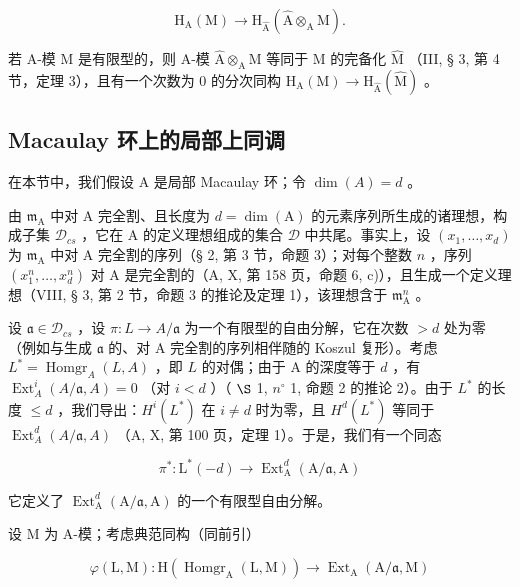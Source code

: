 \[
\mathrm{H} _ {\mathrm{A}} (\mathrm{M}) \longrightarrow \mathrm{H} _ {\widehat {\mathrm{A}}} (\widehat {\mathrm{A}} \otimes_ {\mathrm{A}} \mathrm{M}).
\]

若 A-模 M 是有限型的，则 A-模 \(\widehat{\mathrm{A}}\otimes_{\mathrm{A}}\mathrm{M}\) 等同于 M 的完备化 \(\widehat{\mathrm{M}}\) （III, § 3, 第 4 节，定理 3），且有一个次数为 0 的分次同构 \(\mathrm{H}_{\mathrm{A}}(\mathrm{M})\to \mathrm{H}_{\widehat{\mathrm{A}}}(\widehat{\mathrm{M}})\) 。

\subsection{Macaulay 环上的局部上同调}

在本节中，我们假设 A 是局部 Macaulay 环；令 \(\dim(A) = d\) 。

由 \(\mathfrak{m}_{\mathrm{A}}\) 中对 A 完全割、且长度为 \(d = \dim (\mathrm{A})\) 的元素序列所生成的诸理想，构成子集 \(\mathcal{D}_{cs}\) ，它在 A 的定义理想组成的集合 \(\mathcal{D}\) 中共尾。事实上，设 \((x_{1},\ldots ,x_{d})\) 为 \(\mathfrak{m}_{\mathrm{A}}\) 中对 A 完全割的序列（§ 2, 第 3 节，命题 3）；对每个整数 \(n\) ，序列 \((x_1^n,\dots ,x_d^n)\) 对 A 是完全割的（A, X, 第 158 页，命题 6, c)），且生成一个定义理想（VIII, § 3, 第 2 节，命题 3 的推论及定理 1），该理想含于 \(\mathfrak{m}_{\mathrm{A}}^n\) 。

设 \(\mathfrak{a} \in \mathcal{D}_{cs}\) ，设 \(\pi: L \to A/\mathfrak{a}\) 为一个有限型的自由分解，它在次数 \(>d\) 处为零（例如与生成 \(\mathfrak{a}\) 的、对 A 完全割的序列相伴随的 Koszul 复形）。考虑 \(L^{*} = \operatorname{Homgr}_{A}(L,A)\) ，即 \(L\) 的对偶；由于 A 的深度等于 \(d\) ，有 \(\operatorname{Ext}_{A}^{i}(A/\mathfrak{a}, A) = 0\) （对 \(i < d\) ）（ \(\S\) 1, \(n^{\circ}\) 1, 命题 2 的推论 2）。由于 \(L^{*}\) 的长度 \(\leqslant d\) ，我们导出：\(H^{i}(L^{*})\) 在 \(i \neq d\) 时为零，且 \(H^{d}(L^{*})\) 等同于 \(\operatorname{Ext}_{A}^{d}(A/\mathfrak{a}, A)\) （A, X, 第 100 页，定理 1）。于是，我们有一个同态

\[
\pi^ {*}: \mathrm{L} ^ {*} (- d) \longrightarrow \operatorname{Ext} _ {\mathrm{A}} ^ {d} (\mathrm{A} / \mathfrak {a}, \mathrm{A})
\]

它定义了 \(\operatorname{Ext}_{\mathrm{A}}^{d}(\mathrm{A}/\mathfrak{a},\mathrm{A})\) 的一个有限型自由分解。

设 M 为 A-模；考虑典范同构（同前引）

\[
\varphi (\mathrm{L}, \mathrm{M}): \mathrm{H} (\operatorname{Homgr} _ {\mathrm{A}} (\mathrm{L}, \mathrm{M})) \rightarrow \operatorname{Ext} _ {\mathrm{A}} (\mathrm{A} / \mathfrak {a}, \mathrm{M})
\]

